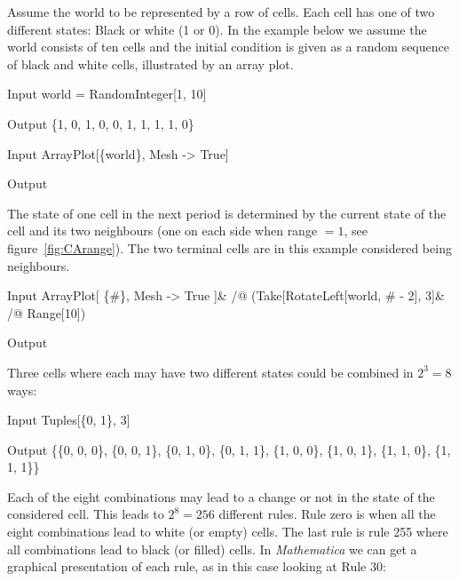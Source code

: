 \documentclass[11pt,fleqn]{book} %
\begin{document}
\begin{theorem}
\hfill \break
Assume the world to be represented by a row of cells. Each cell has one of two different states: Black or white (1 or 0). In the example below we assume the world consists of ten cells and the initial condition is given as a random sequence of black and white cells, illustrated by an array plot.
\begin{mmaCell}[index=1]{Input}
  world = RandomInteger[1, 10]
\end{mmaCell}
\begin{mmaCell}{Output}
  \{1, 0, 1, 0, 0, 1, 1, 1, 1, 0\}
\end{mmaCell}
\begin{mmaCell}{Input}
  ArrayPlot[\{world\}, Mesh -> True]
\end{mmaCell}
\begin{mmaCell}[moregraphics={moreig={scale=.5}}]{Output}
\end{mmaCell}
The state of one cell in the next period is determined by the current state of the cell and its two neighbours (one on each side when range $= 1$, see figure~\ref{fig:CArange}). The two terminal cells are in this example considered being neighbours.
\begin{mmaCell}{Input}
  ArrayPlot[
    \{#\}, Mesh -> True
  ]& /@ (Take[RotateLeft[world, # - 2], 3]& /@ Range[10])
\end{mmaCell}
\begin{mmaCell}[moregraphics={moreig={scale=.4}}]{Output}
\end{mmaCell}
Three cells where each may have two different states could be combined in $2^3=8$ ways:
\begin{mmaCell}{Input}
  Tuples[\{0, 1\}, 3]
\end{mmaCell}
\begin{mmaCell}{Output}
  \{\{0, 0, 0\}, \{0, 0, 1\}, \{0, 1, 0\}, \{0, 1, 1\}, 
  \{1, 0, 0\}, \{1, 0, 1\}, \{1, 1, 0\}, \{1, 1, 1\}\}
\end{mmaCell}
Each of the eight combinations may lead to a change or not in the state of the considered cell. This leads to $2^8=256$ different rules. Rule zero is when all the eight combinations lead to white (or empty) cells. The last rule is rule 255 where all combinations lead to black (or filled) cells. In \textit{Mathematica} we can get a graphical presentation of each rule, as in this case looking at Rule 30:

\end{theorem}
\end{document}

